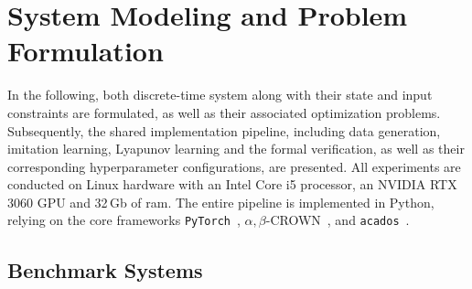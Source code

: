\section{System Modeling and Problem Formulation}
\label{sec:system-modeling}
In the following, both discrete-time system along with their state and input constraints are formulated, 
as well as their associated optimization problems. 
Subsequently, the shared implementation pipeline, including data generation, imitation learning, 
Lyapunov learning and the formal verification, as well as their corresponding hyperparameter configurations, are presented. 
All experiments are conducted on Linux hardware with an Intel Core i5 processor, an NVIDIA RTX 3060 GPU 
and 32\,Gb of ram. The entire pipeline is implemented in Python, relying on the core frameworks \texttt{PyTorch}~\cite{paszkePyTorchImperativeStyle2019}, 
$\alpha,\beta$-CROWN~\cite{wang2021beta,xuFastCompleteEnabling2021}, 
and \texttt{acados}~\cite{verschuerenAcadosModularOpensource2022}.


\subsection{Benchmark Systems}
\label{subsec:benchmark-systems}

